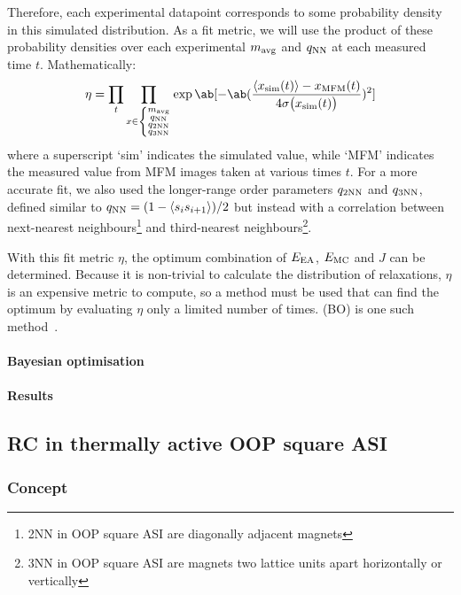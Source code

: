 Therefore, each experimental datapoint corresponds to some probability density in this simulated distribution.
As a fit metric, we will use the product of these probability densities over each experimental $\mavg$ and $\qNN$ at each measured time $t$.
Mathematically:
\begin{equation}
	\eta = \prod_t \prod_{x \in \left\{\substack{\mavg\\\qNN\\\qNN[2]\\\qNN[3]}\right.} \exp\ab[- \ab(\frac{\langle x_\mathrm{sim}(t) \rangle - x_\mathrm{MFM}(t)}{4 \sigma\big(x_\mathrm{sim}(t)\big)})^2]
\end{equation}
where a superscript `sim' indicates the simulated value, while `MFM' indicates the measured value from MFM images taken at various times $t$.
For a more accurate fit, we also used the longer-range order parameters $\qNN[2]$ and $\qNN[3]$, defined similar to $\qNN = (1 - \langle s_i s_{i+1} \rangle)/2$ but instead with a correlation between next-nearest neighbours\footnote{2NN in OOP square ASI are diagonally adjacent magnets} and third-nearest neighbours\footnote{3NN in OOP square ASI are magnets two lattice units apart horizontally or vertically}. \\\par

With this fit metric $\eta$, the optimum combination of $\EEA$, $\EMC$ and $J$ can be determined.
Because it is non-trivial to calculate the distribution of relaxations, $\eta$ is an expensive metric to compute, so a method must be used that can find the optimum by evaluating $\eta$ only a limited number of times.
 (BO) is one such method~\cite{bayesopt_package,BayesOpt_Mockus1975}.
\paragraph{Bayesian optimisation}
\paragraph{Results} %

\subsection{RC in thermally active OOP square ASI}
\subsubsection{Concept} %
